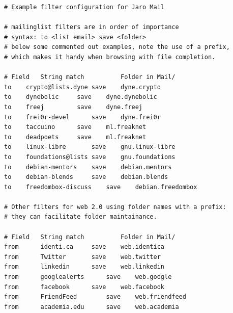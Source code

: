 \documentclass[a4,onecolumn,portrait]{article}
\begin{document}
\begin{verbatim}
# Example filter configuration for Jaro Mail

# mailinglist filters are in order of importance
# syntax: to <list email> save <folder>
# below some commented out examples, note the use of a prefix,
# which makes it handy when browsing with file completion.

# Field   String match          Folder in Mail/
to	  crypto@lists.dyne	save	dyne.crypto
to	  dynebolic		save	dyne.dynebolic
to	  freej			save	dyne.freej
to	  frei0r-devel		save	dyne.frei0r
to	  taccuino		save	ml.freaknet
to	  deadpoets		save	ml.freaknet
to	  linux-libre		save	gnu.linux-libre
to	  foundations@lists	save	gnu.foundations
to	  debian-mentors	save	debian.mentors
to	  debian-blends		save	debian.blends
to	  freedombox-discuss	save	debian.freedombox

# Other filters for web 2.0 using folder names with a prefix:
# they can facilitate folder maintainance.

# Field   String match          Folder in Mail/
from      identi.ca		save	web.identica
from      Twitter		save	web.twitter
from      linkedin		save	web.linkedin
from      googlealerts		save	web.google
from      facebook		save	web.facebook
from      FriendFeed		save	web.friendfeed
from      academia.edu		save	web.academia
\end{verbatim}
\end{document}
